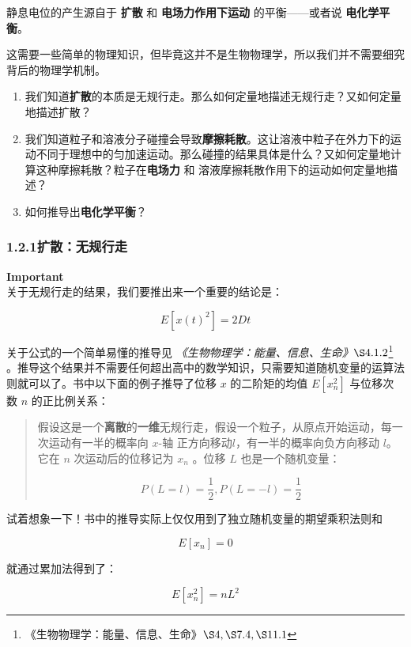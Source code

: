 \documentclass[
]{article}
\begin{document}
静息电位的产生源自于 \textbf{扩散} 和 \textbf{电场力作用下运动}
的平衡------或者说 \textbf{电化学平衡}。

这需要一些简单的物理知识，但毕竟这并不是生物物理学，所以我们并不需要细究背后的物理学机制。

\begin{enumerate}
\def\labelenumi{\arabic{enumi}.}
\item
  我们知道\textbf{扩散}的本质是无规行走。那么如何定量地描述无规行走？又如何定量地描述扩散？
\item
  我们知道粒子和溶液分子碰撞会导致\textbf{摩擦耗散}。这让溶液中粒子在外力下的运动不同于理想中的匀加速运动。那么碰撞的结果具体是什么？又如何定量地计算这种摩擦耗散？粒子在\textbf{电场力}
  和 溶液摩擦耗散作用下的运动如何定量地描述？
\item
  如何推导出\textbf{电化学平衡}？
\end{enumerate}

\subsubsection{1.2.1扩散：无规行走}\label{121ux6269ux6563ux65e0ux89c4ux884cux8d70}

\textbf{Important}\\

关于无规行走的结果，我们要推出来一个重要的结论是：

\[E[x(t)^2]=2Dt\]

关于公式的一个简单易懂的推导见
\emph{《生物物理学：能量、信息、生命》\(\S4.1.2\)}\footnote{《生物物理学：能量、信息、生命》\(\S4,\S7.4,\S11.1\)}
。推导这个结果并不需要任何超出高中的数学知识，只需要知道随机变量的运算法则就可以了。书中以下面的例子推导了位移
\(x\) 的二阶矩的均值 \(E[x_n^2]\) 与位移次数 \(n\) 的正比例关系：

\begin{quote}
假设这是一个\textbf{离散}的\textbf{一维}无规行走，假设一个粒子，从原点开始运动，每一次运动有一半的概率向
\(x\)-轴 正方向移动\(l\)，有一半的概率向负方向移动 \(l\)。它在 \(n\)
次运动后的位移记为 \(x_n\) 。位移 \(L\) 也是一个随机变量：

\[P(L=l)=\frac{1}{2},P(L=-l)=\frac{1}{2}\]
\end{quote}

试着想象一下！书中的推导实际上仅仅用到了独立随机变量的期望乘积法则和

\[E[x_n]=0\]

就通过累加法得到了：

\[E[x_n^2]=nL^2\]
\end{document}
